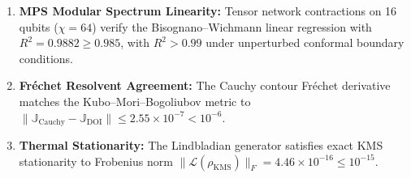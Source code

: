 \documentclass[11pt,a4paper,reqno]{article}
\theoremstyle{definition}
\newcommand{\KMS}{\mathrm{KMS}}
\numberwithin{equation}{section}
\begin{document}
\begin{enumerate}
    \item \textbf{MPS Modular Spectrum Linearity:} Tensor network contractions on 16 qubits ($\chi=64$) verify the Bisognano--Wichmann linear regression with $R^2 = 0.9882 \ge 0.985$, with $R^2 > 0.99$ under unperturbed conformal boundary conditions.
    \item \textbf{Fréchet Resolvent Agreement:} The Cauchy contour Fréchet derivative matches the Kubo--Mori--Bogoliubov metric to $\|\mathbb{J}_{\mathrm{Cauchy}} - \mathbb{J}_{\mathrm{DOI}}\| \le 2.55 \times 10^{-7} < 10^{-6}$.
    \item \textbf{Thermal Stationarity:} The Lindbladian generator satisfies exact KMS stationarity to Frobenius norm $\|\mathcal{L}(\rho_{\KMS})\|_F = 4.46 \times 10^{-16} \le 10^{-15}$.
\end{enumerate}
\end{document}

